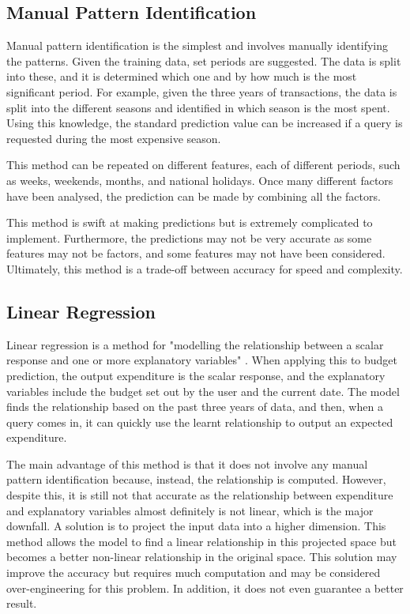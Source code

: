 \subsection{Manual Pattern Identification}
Manual pattern identification is the simplest and involves manually identifying the patterns. Given the training data, set periods are suggested. The data is split into these, and it is determined which one and by how much is the most significant period. For example, given the three years of transactions, the data is split into the different seasons and identified in which season is the most spent. Using this knowledge, the standard prediction value can be increased if a query is requested during the most expensive season.

This method can be repeated on different features, each of different periods, such as weeks, weekends, months, and national holidays. Once many different factors have been analysed, the prediction can be made by combining all the factors.

This method is swift at making predictions but is extremely complicated to implement. Furthermore, the predictions may not be very accurate as some features may not be factors, and some features may not have been considered. Ultimately, this method is a trade-off between accuracy for speed and complexity.

\subsection{Linear Regression}
Linear regression is a method for "modelling the relationship between a scalar response and one or more explanatory variables" \cite{LinearRegressionWiki}. When applying this to budget prediction, the output expenditure is the scalar response, and the explanatory variables include the budget set out by the user and the current date. The model finds the relationship based on the past three years of data, and then, when a query comes in, it can quickly use the learnt relationship to output an expected expenditure.

The main advantage of this method is that it does not involve any manual pattern identification because, instead, the relationship is computed. However, despite this, it is still not that accurate as the relationship between expenditure and explanatory variables almost definitely is not linear, which is the major downfall. A solution is to project the input data into a higher dimension. This method allows the model to find a linear relationship in this projected space but becomes a better non-linear relationship in the original space. This solution may improve the accuracy but requires much computation and may be considered over-engineering for this problem. In addition, it does not even guarantee a better result.

